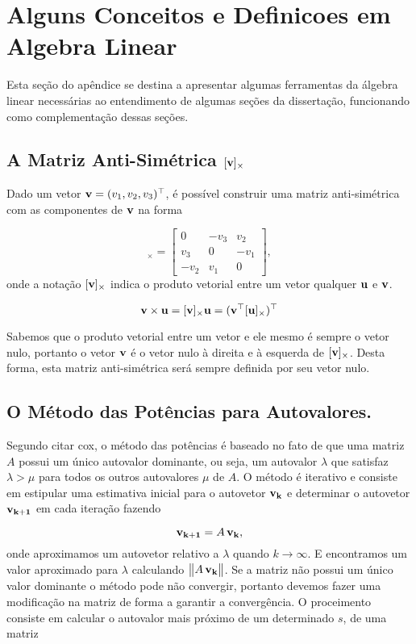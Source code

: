 \section{Alguns Conceitos e Definicoes em Algebra Linear}
Esta seção do apêndice se destina a apresentar algumas ferramentas da álgebra linear necessárias ao entendimento de algumas seções da dissertação, funcionando como complementação dessas seções.

\subsection{A Matriz Anti-Simétrica $[{\bf v}]_\times$}
Dado um vetor ${\bf v}=(v_1,v_2,v_3)^\top$, é possível construir uma matriz anti-simétrica com as componentes de ${\bf v}$ na forma

\begin{equation*}
[{\bf v}]_\times=
\begin{bmatrix}
0&-v_3&v_2\\
v_3&0&-v_1\\
-v_2&v_1&0
\end{bmatrix},
\end{equation*}
onde a notação $[{\bf v}]_\times$ indica o produto vetorial entre um vetor qualquer ${\bf u}$ e ${\bf v}$. 

\begin{equation*}
{\bf v} \times {\bf u} = [{\bf v}]_\times {\bf u} = ({\bf v}^\top [{\bf u}]_\times)^\top
\end{equation*}

Sabemos que o produto vetorial entre um vetor e ele mesmo é sempre o vetor nulo, portanto o vetor ${\bf v}$ é o vetor nulo à direita e à esquerda de $[{\bf v}]_\times$. Desta forma, esta matriz anti-simétrica será sempre definida por seu vetor nulo.  


\subsection{O Método das Potências para Autovalores.}
Segundo citar cox, o método das potências é baseado no fato de que uma matriz $A$ possui um único autovalor dominante, ou seja, um autovalor $\lambda$ que satisfaz $\lambda > \mu$ para todos os outros autovalores $\mu$ de $A$. O método é iterativo e consiste em estipular uma estimativa inicial para o autovetor ${\bf v_k}$ e determinar o autovetor ${\bf v_{k+1}}$ em cada iteração fazendo

\begin{equation*}
{\bf v_{k+1}}=A\,{\bf v_k},
\end{equation*}
onde aproximamos um autovetor relativo a $\lambda$ quando $k\rightarrow \infty$. E encontramos um valor aproximado para $\lambda$ calculando $\begin{Vmatrix}
A\,{\bf v_k}\end{Vmatrix}$. Se a matriz não possui um único valor dominante o método pode não convergir, portanto devemos fazer uma modificação na matriz de forma a garantir a convergência. O proceimento consiste em calcular o autovalor mais próximo de um determinado $s$, de uma matriz


